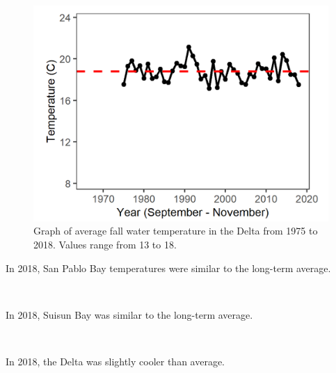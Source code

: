 \documentclass[
]{book}
\begin{document}
\begin{panel-grid}
\begin{columns-nocenter}
\begin{column800}
\begin{expand}
\begin{figure}
\includegraphics[width=15.25in]{figures/temp_dtfall} \caption{Graph of average fall water temperature in the Delta from 1975 to 2018. Values range from 13 to 18.}\label{fig:unnamed-chunk-104}
\end{figure}

\end{expand}

\end{column800}

\end{columns-nocenter}

\begin{columns-nocenter}

\begin{column800}

In 2018, San Pablo Bay temperatures were similar to the long-term average.

\end{column800}

\begin{column40}

~

\end{column40}

\begin{column800}

In 2018, Suisun Bay was similar to the long-term average.

\end{column800}

\begin{column40}

~

\end{column40}

\begin{column800}

In 2018, the Delta was slightly cooler than average.

\end{column800}

\end{columns-nocenter}

\end{panel-grid}
\end{document}
